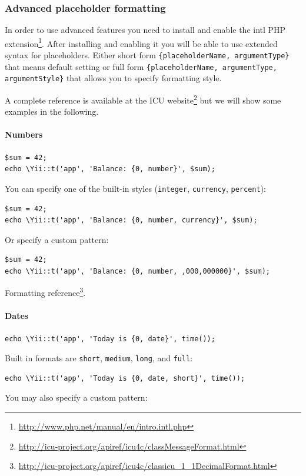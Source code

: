 \subsubsection{Advanced placeholder formatting}
In order to use advanced features you need to install and enable the intl PHP extension\footnote{\url{http://www.php.net/manual/en/intro.intl.php}}.
After installing and enabling it you will be able to use extended syntax for placeholders. Either short form
\lstinline|{placeholderName, argumentType}| that means default setting or full form \lstinline|{placeholderName, argumentType, argumentStyle}|
that allows you to specify formatting style.

A complete reference is available at the ICU website\footnote{\url{http://icu-project.org/apiref/icu4c/classMessageFormat.html}} but we will show some examples in the following.

\paragraph{Numbers}
\lstset{language=php}\begin{lstlisting}
$sum = 42;
echo \Yii::t('app', 'Balance: {0, number}', $sum);
\end{lstlisting}
You can specify one of the built-in styles (\lstinline|integer|, \lstinline|currency|, \lstinline|percent|):

\lstset{language=php}\begin{lstlisting}
$sum = 42;
echo \Yii::t('app', 'Balance: {0, number, currency}', $sum);
\end{lstlisting}
Or specify a custom pattern:

\lstset{language=php}\begin{lstlisting}
$sum = 42;
echo \Yii::t('app', 'Balance: {0, number, ,000,000000}', $sum);
\end{lstlisting}
Formatting reference\footnote{\url{http://icu-project.org/apiref/icu4c/classicu\_1\_1DecimalFormat.html}}.

\paragraph{Dates}
\lstset{language=php}\begin{lstlisting}
echo \Yii::t('app', 'Today is {0, date}', time());
\end{lstlisting}
Built in formats are \lstinline|short|, \lstinline|medium|, \lstinline|long|, and \lstinline|full|:

\lstset{language=php}\begin{lstlisting}
echo \Yii::t('app', 'Today is {0, date, short}', time());
\end{lstlisting}
You may also specify a custom pattern:

